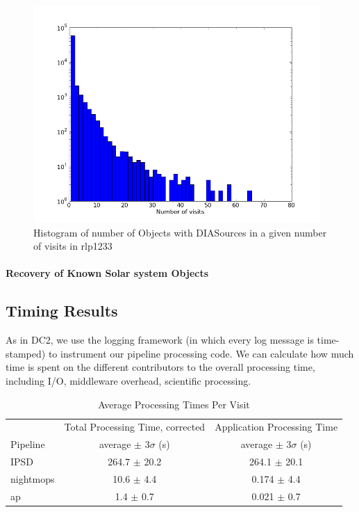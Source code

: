 \begin{figure}[htb]
\begin{center}
\includegraphics[height=3.25in]{images/rlp1233DiffLCHisto.png}
\caption{Histogram of number of Objects with DIASources in a given number of
  visits in rlp1233}  
\label{fig:lightcurve1}
\end{center}
\end{figure}

  
\paragraph{Recovery of Known Solar system Objects}

\subsection{Timing Results}
\label{sec:timing}

As in DC2, we use the logging framework (in which every log message is
time-stamped) to instrument our pipeline processing code.  We can
calculate how much time is spent on the different contributors to the
overall processing time, including I/O, middleware overhead,
scientific processing.  

\begin{table}[ht]
\begin{center}
\caption{Average Processing Times Per Visit
\label{tbl:visitstats}}
\vspace{\baselineskip}
\begin{tabular}{ l | c | c }
\hline\hline
          & Total Processing Time, corrected
          & Application Processing Time \\ 
Pipeline  & average $\pm$  $3\sigma$ (s) & average $\pm$ $3\sigma$ (s) \\ \hline
IPSD      & 264.7 $\pm$ 20.2 & 264.1 $\pm$ 20.1  \\ 
nightmops & 10.6  $\pm$  4.4 & 0.174 $\pm$  4.4  \\ 
ap        & 1.4   $\pm$  0.7 & 0.021 $\pm$  0.7  \\ \hline
\hline
\end{tabular}

\end{center}
\end{table}


